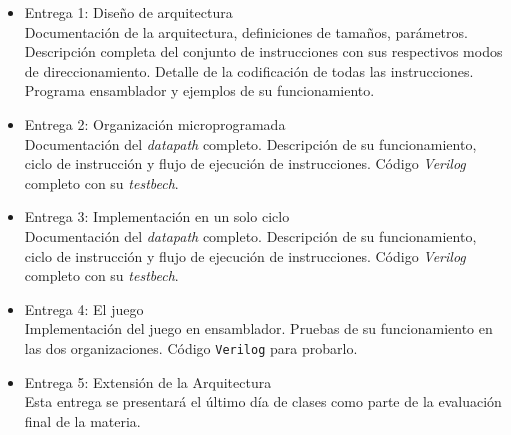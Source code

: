 \documentclass[a4paper,11pt]{article}
\begin{document}
\begin{itemize}
\item Entrega 1: Diseño de arquitectura\\
Documentación de la arquitectura, definiciones de tamaños, parámetros. Descripción completa del conjunto de instrucciones con sus respectivos modos de direccionamiento. Detalle de la codificación de todas las instrucciones. Programa ensamblador y ejemplos de su funcionamiento.
\item Entrega 2: Organización microprogramada\\
Documentación del \emph{datapath} completo. Descripción de su funcionamiento, ciclo de instrucción y flujo de ejecución de instrucciones. Código \emph{Verilog} completo con su \emph{testbech}.
\item Entrega 3: Implementación en un solo ciclo\\
Documentación del \emph{datapath} completo. Descripción de su funcionamiento, ciclo de instrucción y flujo de ejecución de instrucciones. Código \emph{Verilog} completo con su \emph{testbech}.
\item Entrega 4: El juego\\
Implementación del juego en ensamblador. Pruebas de su funcionamiento en las dos organizaciones. Código \texttt{Verilog} para probarlo.
\item Entrega 5: Extensión de la Arquitectura\\
Esta entrega se presentará el último día de clases como parte de la evaluación final de la materia.
\end{itemize}
\end{document}
